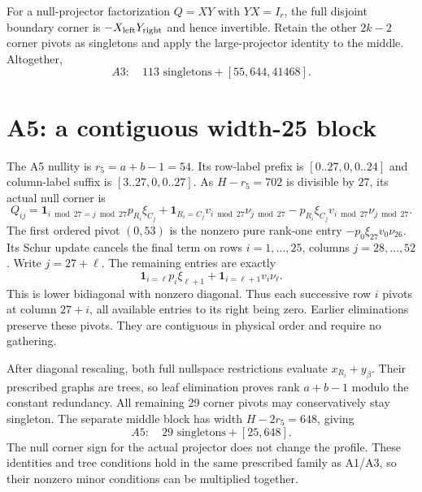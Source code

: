 \documentclass[11pt]{article}
\begin{document}
For a null-projector factorization $Q=XY$ with $YX=I_r$, the full disjoint boundary corner is $-X_{\rm left}Y_{\rm right}$ and hence invertible. Retain the other $2k-2$ corner pivots as singletons and apply the large-projector identity to the middle. Altogether,
\[
A3:\quad 113\text{ singletons}+ [55,644,41468].
\]

\section{A5: a contiguous width-25 block}
The A5 nullity is $r_5=a+b-1=54$. Its row-label prefix is $[0..27,0,0..24]$ and column-label suffix is $[3..27,0,0..27]$. As $H-r_5=702$ is divisible by $27$, its actual null corner is
\[
Q_{ij}=\mathbf1_{i\bmod27=j\bmod27}p_{R_i}\xi_{C_j}
 +\mathbf1_{R_i=C_j}v_{i\bmod27}\nu_{j\bmod27}
 -p_{R_i}\xi_{C_j}v_{i\bmod27}\nu_{j\bmod27}.
\]
The first ordered pivot $(0,53)$ is the nonzero pure rank-one entry $-p_0\xi_{27}v_0\nu_{26}$. Its Schur update cancels the final term on rows $i=1,\ldots,25$, columns $j=28,\ldots,52$. Write $j=27+\ell$. The remaining entries are exactly
\[
\mathbf1_{i=\ell}p_i\xi_{\ell+1}
 +\mathbf1_{i=\ell+1}v_i\nu_\ell.
\]
This is lower bidiagonal with nonzero diagonal. Thus each successive row $i$ pivots at column $27+i$, all available entries to its right being zero. Earlier eliminations preserve these pivots. They are contiguous in physical order and require no gathering.

After diagonal rescaling, both full nullspace restrictions evaluate $x_{R_i}+y_\beta$. Their prescribed graphs are trees, so leaf elimination proves rank $a+b-1$ modulo the constant redundancy. All remaining 29 corner pivots may conservatively stay singleton. The separate middle block has width $H-2r_5=648$, giving
\[
A5:\quad29\text{ singletons}+[25,648].
\]
The null corner sign for the actual projector does not change the profile. These identities and tree conditions hold in the same prescribed family as A1/A3, so their nonzero minor conditions can be multiplied together.
\end{document}
